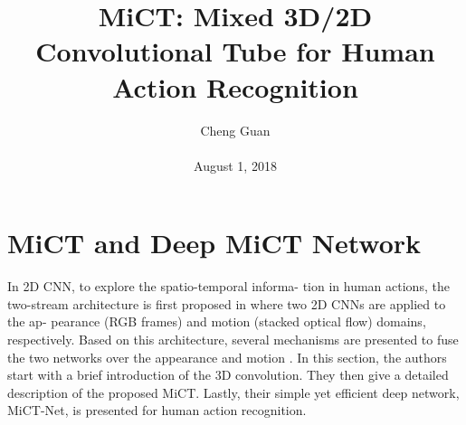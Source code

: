 \documentclass[10pt,twocolumn,letterpaper]{article}
\title{MiCT: Mixed 3D/2D Convolutional Tube for Human Action Recognition}
\author{Cheng Guan\\\\
August 1, 2018}
\begin{document}
\maketitle
\section{MiCT and Deep MiCT Network}
In 2D CNN, to explore the spatio-temporal informa-
tion in human actions, the two-stream architecture is first
proposed in \cite{simonyan2014two} where two 2D CNNs are applied to the ap-
pearance (RGB frames) and motion (stacked optical flow)
domains, respectively. Based on this architecture, several
mechanisms are presented to fuse the two networks over
the appearance and motion \cite{karpathy2014large,feichtenhofer2016convolutional,he2016deep}.
In this section, the authors start with a brief introduction of the 3D convolution. They then give a detailed description of the
proposed MiCT. Lastly, their simple yet efficient deep network, MiCT-Net, is presented for human action recognition.
\end{document}
